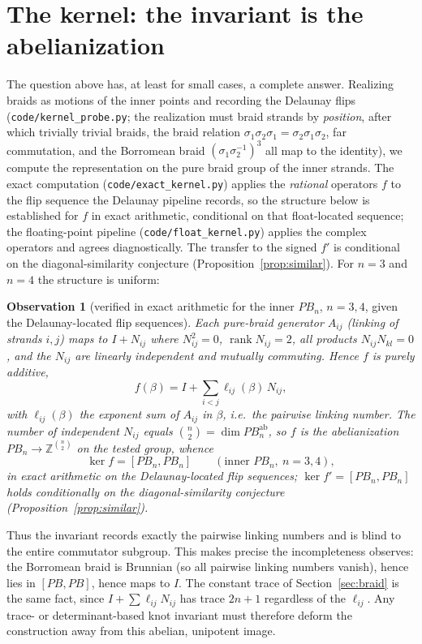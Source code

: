 \documentclass[11pt]{article}
\theoremstyle{plain}
\newtheorem{observation}[theorem]{Observation}
\theoremstyle{definition}
\theoremstyle{remark}
\begin{document}
\section{The kernel: the invariant is the abelianization}\label{sec:kernel}
The question above has, at least for small cases, a complete answer. Realizing braids as
motions of the inner points and recording the Delaunay flips \cite{aurenhammer} (\texttt{code/kernel\_probe.py};
the realization must braid strands by \emph{position}, after which trivially trivial braids, the
braid relation $\sigma_1\sigma_2\sigma_1=\sigma_2\sigma_1\sigma_2$, far commutation, and the
Borromean braid $(\sigma_1\sigma_2^{-1})^3$ all map to the identity), we compute the representation on
the pure braid group of the inner strands. The exact computation (\texttt{code/exact\_kernel.py}) applies the \emph{rational} operators $f$ to the
flip sequence the Delaunay pipeline records, so the structure below is established for $f$ in exact
arithmetic, conditional on that float-located sequence; the floating-point pipeline
(\texttt{code/float\_kernel.py}) applies the complex operators and agrees diagnostically. The transfer to
the signed $f'$ is conditional on the diagonal-similarity conjecture (Proposition~\ref{prop:similar}).
For $n=3$ and $n=4$ the structure is uniform:

\begin{observation}[verified in exact arithmetic for the inner $PB_n$, $n=3,4$, given the Delaunay-located flip sequences]\label{obs:abelian}
Each pure-braid generator $A_{ij}$ (linking of strands $i,j$) maps to $I+N_{ij}$ where
$N_{ij}^2=0$, $\operatorname{rank}N_{ij}=2$, \emph{all products} $N_{ij}N_{kl}=0$, and the $N_{ij}$
are linearly independent and mutually commuting. Hence $f$ is purely additive,
\[
   f(\beta)=I+\sum_{i<j}\ell_{ij}(\beta)\,N_{ij},
\]
with $\ell_{ij}(\beta)$ the exponent sum of $A_{ij}$ in $\beta$, i.e.\ the pairwise linking number.
The number of independent $N_{ij}$ equals $\binom{n}{2}=\dim PB_n^{\mathrm{ab}}$, so $f$ is the
abelianization $PB_n\to\mathbb{Z}^{\binom n2}$ on the tested group, whence
\[
   \ker f=[PB_n,PB_n]\qquad(\text{inner }PB_n,\ n=3,4),
\]
in exact arithmetic on the Delaunay-located flip sequences; $\ker f'=[PB_n,PB_n]$ holds conditionally on
the diagonal-similarity conjecture (Proposition~\ref{prop:similar}).
\end{observation}

Thus the invariant records exactly the pairwise linking numbers and is blind to the entire commutator
subgroup. This makes precise the incompleteness \cite{rohozhkin2026} observes: the Borromean braid is
Brunnian \cite{kassel-turaev} (so all pairwise linking numbers vanish), hence lies in $[PB,PB]$, hence maps to $I$. The constant trace of
Section~\ref{sec:braid} is the same fact, since $I+\sum\ell_{ij}N_{ij}$ has trace $2n+1$ regardless of
the $\ell_{ij}$. Any trace- or determinant-based knot invariant must therefore deform the construction
away from this abelian, unipotent image.
\end{document}
